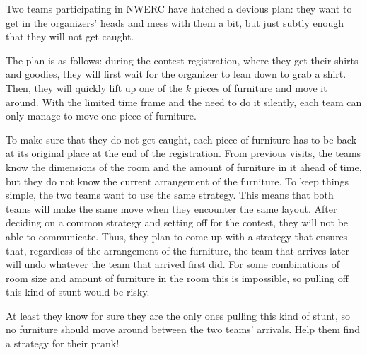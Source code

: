


Two teams participating in NWERC have hatched a devious plan:
they want to get in the organizers' heads and mess with them a bit, but just subtly enough
that they will not get caught.

The plan is as follows: during the contest registration, where they get
their shirts and goodies, they will first wait for the organizer to lean down to grab
a shirt.
Then, they will quickly lift up one of the $k$ pieces of furniture and move it around.
With the limited time
frame and the need to do it silently, each team can only manage to move one piece of furniture.

To make sure that they do not get caught, each piece of furniture has to be back at its original place at the end of the registration.
From previous visits, the teams know the dimensions of the room and the amount of furniture in it
ahead of time, but they do not know the current arrangement of the furniture.
To keep things simple, the two teams want to use the same strategy.
This means that both teams will make the same move when they encounter the same layout.
After deciding on a common strategy and setting off for the contest, they will not be able to communicate.
Thus, they plan to come up with a strategy that ensures that, regardless of the
arrangement of the furniture,
the team that arrives later will undo whatever the team that arrived first did.
For some combinations of room size and amount of furniture in the room this is impossible,
so pulling off this kind of stunt would be risky.

At least they know for sure they are the only ones pulling this kind of stunt, so no furniture
should move around between the two teams' arrivals. Help them find a strategy for their prank!

